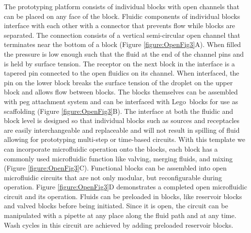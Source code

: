 The prototyping platform consists of individual blocks with open channels that can be placed on any face of the block. Fluidic components of individual blocks interface with each other with a connector that prevents flow while blocks are separated. The connection consists of a vertical semi-circular open channel that terminates near the bottom of a block (Figure \ref{figure:OpenFig3}A). When filled the pressure is low enough such that the fluid at the end of the channel pins and is held by surface tension. The receptor on the next block in the interface is a tapered pin connected to the open fluidics on its channel. When interfaced, the pin on the lower block breaks the surface tension of the droplet on the upper block and allows flow between blocks. The blocks themselves can be assembled with peg attachment system and can be interfaced with Lego\textregistered\ blocks for use as scaffolding (Figure \ref{figure:OpenFig3}B). The interface at both the fluidic and block level is designed so that individual blocks such as sources and receptacles are easily interchangeable and replaceable and will not result in spilling of fluid allowing for prototyping multi-step or time-based circuits. With this template we can incorporate microfluidic operation onto the blocks, each block has a commonly used microfluidic function like valving, merging fluids, and mixing (Figure \ref{figure:OpenFig3}C). Functional blocks can be assembled into open microfluidic circuits that are not only modular, but reconfigurable during operation. Figure \ref{figure:OpenFig3}D demonstrates a completed open microfluidic circuit and its operation. Fluids can be preloaded in blocks, like reservoir blocks and valved blocks before being initiated. Since it is open, the circuit can be manipulated with a pipette at any place along the fluid path and at any time. Wash cycles in this circuit are achieved by adding preloaded reservoir blocks.



